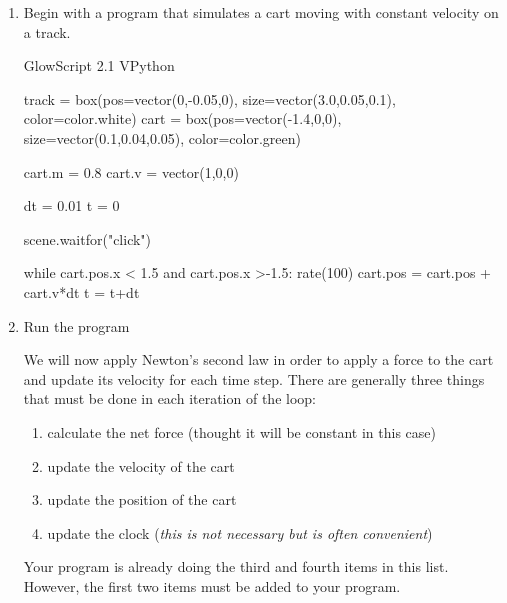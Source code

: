 \begin{enumerate}
	\item Begin with a program that simulates a cart moving with constant velocity on a track.
	
\begin{vpythonblock}
GlowScript 2.1 VPython

track = box(pos=vector(0,-0.05,0), size=vector(3.0,0.05,0.1), color=color.white)
cart = box(pos=vector(-1.4,0,0), size=vector(0.1,0.04,0.05), color=color.green)

cart.m = 0.8
cart.v = vector(1,0,0)

dt = 0.01
t = 0

scene.waitfor("click")

while cart.pos.x < 1.5 and cart.pos.x >-1.5:
    rate(100)
    cart.pos = cart.pos + cart.v*dt
    t = t+dt

\end{vpythonblock}

	\item Run the program







We will now apply Newton's second law in order to apply a force to the cart and update its velocity for each time step. There are generally three things that must be done in each iteration of the loop:
	
	\begin{enumerate}
		\item calculate the net force (thought it will be constant in this case)
		\item update the velocity of the cart
		\item update the position of the cart
		\item update the clock (\emph{this is not necessary but is often convenient})
	\end{enumerate}

Your program is already doing the third and fourth items in this list. However, the first two items must be added to your program.


\end{enumerate}
